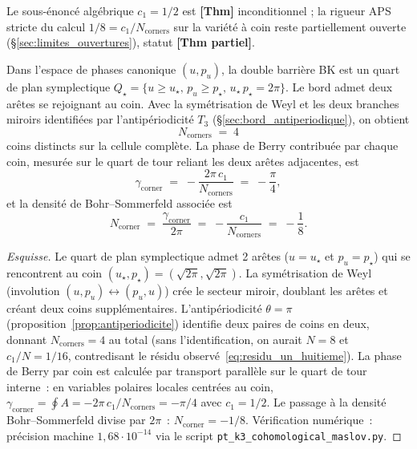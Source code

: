 Le sous-énoncé algébrique $c_1 = 1/2$ est \textbf{[Thm]} inconditionnel ;
la rigueur APS stricte du calcul $1/8 = c_1/N_{\mathrm{corners}}$ sur la
variété à coin reste partiellement ouverte (\S\ref{sec:limites_ouvertures}),
statut \textbf{[Thm partiel]}.

\begin{proposition}
\label{prop:c1_sur_N}
Dans l'espace de phases canonique $(u, p_u)$, la double barrière BK est
un quart de plan symplectique
$Q_\star = \{u \ge u_\star,\, p_u \ge p_\star,\, u_\star\,p_\star = 2\pi\}$.
Le bord admet deux arêtes se rejoignant au coin. Avec la symétrisation
de Weyl et les deux branches miroirs identifiées par l'antipériodicité
$T_3$ (\S\ref{sec:bord_antiperiodique}), on obtient
\begin{equation}
N_{\mathrm{corners}} \;=\; 4
\label{eq:Ncoins}
\end{equation}
coins distincts sur la cellule complète. La phase de Berry contribuée par
chaque coin, mesurée sur le quart de tour reliant les deux arêtes
adjacentes, est
\begin{equation}
\gamma_{\mathrm{corner}} \;=\; -\dfrac{2\pi\,c_1}{N_{\mathrm{corners}}} \;=\; -\dfrac{\pi}{4},
\label{eq:gamma_corner}
\end{equation}
et la densité de Bohr--Sommerfeld associée est
\begin{equation}
\boxed{\;N_{\mathrm{corner}} \;=\; \dfrac{\gamma_{\mathrm{corner}}}{2\pi} \;=\; -\dfrac{c_1}{N_{\mathrm{corners}}} \;=\; -\dfrac{1}{8}.\;}
\label{eq:c1_sur_N}
\end{equation}
\end{proposition}

\begin{proof}[Esquisse]
Le quart de plan symplectique admet 2 arêtes ($u = u_\star$ et
$p_u = p_\star$) qui se rencontrent au coin
$(u_\star, p_\star) = (\sqrt{2\pi}, \sqrt{2\pi})$. La symétrisation de
Weyl (involution $(u, p_u) \leftrightarrow (p_u, u)$) crée le secteur
miroir, doublant les arêtes et créant deux coins supplémentaires.
L'antipériodicité $\theta = \pi$ (proposition~\ref{prop:antiperiodicite})
identifie deux paires de coins en deux, donnant $N_{\mathrm{corners}} = 4$
au total (sans l'identification, on aurait $N = 8$ et
$c_1/N = 1/16$, contredisant le résidu observé~\eqref{eq:residu_un_huitieme}).
La phase de Berry par coin est calculée par transport parallèle sur le
quart de tour interne~: en variables polaires locales centrées au coin,
$\gamma_{\mathrm{corner}} = \oint A = -2\pi\,c_1/N_{\mathrm{corners}} = -\pi/4$
avec $c_1 = 1/2$. Le passage à la densité Bohr--Sommerfeld divise par
$2\pi$~: $N_{\mathrm{corner}} = -1/8$. Vérification numérique~: précision
machine $1{,}68 \cdot 10^{-14}$ via le script \texttt{pt\_k3\_cohomological\_maslov.py}.
\end{proof}

